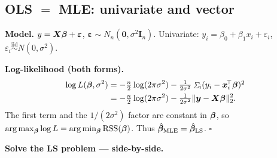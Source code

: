 \subsection{OLS $=$ MLE: univariate and vector}

\textbf{Model.} $y=\bm{X}\bm{\beta}+\bm\varepsilon$, $\bm\varepsilon\sim N_n(\bm 0,\sigma^2 \bm I_n)$. Univariate: $y_i=\beta_0+\beta_1 x_i+\varepsilon_i$, $\varepsilon_i\overset{\text{iid}}\sim N(0,\sigma^2)$.

\textbf{Log-likelihood (both forms).}
\begin{align*}
\log L(\bm{\beta},\sigma^2)
&= -\tfrac{n}{2}\log(2\pi\sigma^2) - \tfrac{1}{2\sigma^2}\textstyle\mathop{\mathit{\Sigma}}_i (y_i-\bm{x}_i^{\!\top}\bm{\beta})^2\\
&= -\tfrac{n}{2}\log(2\pi\sigma^2) - \tfrac{1}{2\sigma^2}\|\bm{y}-\bm{X}\bm{\beta}\|_2^2.
\end{align*}
The first term and the $1/(2\sigma^2)$ factor are constant in $\bm{\beta}$, so $\arg\max_{\bm{\beta}}\log L = \arg\min_{\bm{\beta}}\mathrm{RSS}(\bm{\beta})$. Thus $\hat{\bm{\beta}}_{\text{MLE}}=\hat{\bm{\beta}}_{\text{LS}}$. $\square$

\smallskip
\textbf{Solve the LS problem — side-by-side.}

